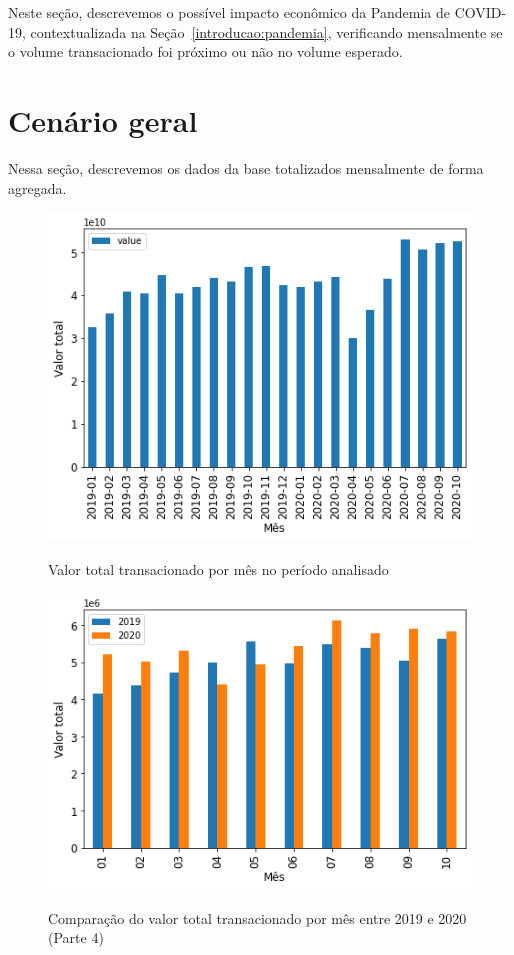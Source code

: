 
Neste seção, descrevemos o possível impacto econômico da Pandemia de COVID-19, contextualizada na Seção~\ref{introducao:pandemia}, verificando mensalmente se o volume transacionado foi próximo ou não no volume esperado.

\section{Cenário geral}

Nessa seção, descrevemos os dados da base totalizados mensalmente de forma agregada.

\begin{figure}[htb]
	\centering
    \caption{Valor total transacionado por mês no período analisado}
    \includegraphics[scale=0.7]{images/base-de-dados-18.1-valor-mensal-total.png}
    \label{fig:pandemia:base-de-dados-18.1-valor-mensal-total}
    \fdadospesquisa
\end{figure}

\begin{figure}[htb]
	\centering
    \caption{Comparação do valor total transacionado por mês entre 2019 e 2020 (Parte 4)}
    \includegraphics[scale=0.7]{images/base-de-dados-19.1-comparacao-valor-mensal-total.png}
    \label{fig:pandemia:base-de-dados-19.1-comparacao-valor-mensal-total}
    \fdadospesquisa
\end{figure}

